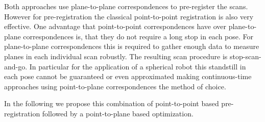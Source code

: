 Both approaches use plane-to-plane correspondences to pre-register the scans. However for pre-registration the classical point-to-point registration is also very effective. 
One advantage that point-to-point correspondences have over plane-to-plane correspondences is, that they do not require a long stop in each pose. For plane-to-plane correspondences this is required to gather enough data to measure planes in each individual scan robustly.
The resulting scan procedure is stop-scan-and-go.
In particular for the application of a spherical robot this standstill in each pose cannot be guaranteed or even approximated making continuous-time approaches using point-to-plane correspondences the method of choice.

In the following we propose this combination of point-to-point based pre-registration followed by a point-to-plane based optimization. 
